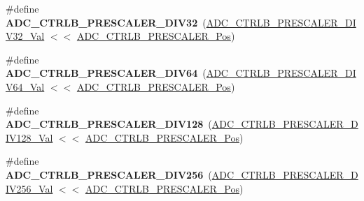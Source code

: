 \begin{DoxyCompactItemize}
\item 
\hypertarget{group___s_a_m_l21___a_d_c_ga4358e8572e688d1b0df0c34ca40dfc31}{}\#define {\bfseries A\+D\+C\+\_\+\+C\+T\+R\+L\+B\+\_\+\+P\+R\+E\+S\+C\+A\+L\+E\+R\+\_\+\+D\+I\+V32}~(\hyperlink{group___s_a_m_l21___a_d_c_gafd19aa73d07682c0d5d7fdda8ab230b5}{A\+D\+C\+\_\+\+C\+T\+R\+L\+B\+\_\+\+P\+R\+E\+S\+C\+A\+L\+E\+R\+\_\+\+D\+I\+V32\+\_\+\+Val} $<$$<$ \hyperlink{group___s_a_m_l21___a_d_c_ga67bbef18402c0d73dcc1698fa185ab76}{A\+D\+C\+\_\+\+C\+T\+R\+L\+B\+\_\+\+P\+R\+E\+S\+C\+A\+L\+E\+R\+\_\+\+Pos})\label{group___s_a_m_l21___a_d_c_ga4358e8572e688d1b0df0c34ca40dfc31}

\item 
\hypertarget{group___s_a_m_l21___a_d_c_gaf1291f3bcbf319b3200863a13855d8fe}{}\#define {\bfseries A\+D\+C\+\_\+\+C\+T\+R\+L\+B\+\_\+\+P\+R\+E\+S\+C\+A\+L\+E\+R\+\_\+\+D\+I\+V64}~(\hyperlink{group___s_a_m_l21___a_d_c_gafe5f527bda931e57829d72bfd2e9497f}{A\+D\+C\+\_\+\+C\+T\+R\+L\+B\+\_\+\+P\+R\+E\+S\+C\+A\+L\+E\+R\+\_\+\+D\+I\+V64\+\_\+\+Val} $<$$<$ \hyperlink{group___s_a_m_l21___a_d_c_ga67bbef18402c0d73dcc1698fa185ab76}{A\+D\+C\+\_\+\+C\+T\+R\+L\+B\+\_\+\+P\+R\+E\+S\+C\+A\+L\+E\+R\+\_\+\+Pos})\label{group___s_a_m_l21___a_d_c_gaf1291f3bcbf319b3200863a13855d8fe}

\item 
\hypertarget{group___s_a_m_l21___a_d_c_ga2a85edd59046e0d96f4426a94dfc695e}{}\#define {\bfseries A\+D\+C\+\_\+\+C\+T\+R\+L\+B\+\_\+\+P\+R\+E\+S\+C\+A\+L\+E\+R\+\_\+\+D\+I\+V128}~(\hyperlink{group___s_a_m_l21___a_d_c_ga358d362ec0e79900891a5f240fdab4ec}{A\+D\+C\+\_\+\+C\+T\+R\+L\+B\+\_\+\+P\+R\+E\+S\+C\+A\+L\+E\+R\+\_\+\+D\+I\+V128\+\_\+\+Val} $<$$<$ \hyperlink{group___s_a_m_l21___a_d_c_ga67bbef18402c0d73dcc1698fa185ab76}{A\+D\+C\+\_\+\+C\+T\+R\+L\+B\+\_\+\+P\+R\+E\+S\+C\+A\+L\+E\+R\+\_\+\+Pos})\label{group___s_a_m_l21___a_d_c_ga2a85edd59046e0d96f4426a94dfc695e}

\item 
\hypertarget{group___s_a_m_l21___a_d_c_ga5c9e7c35c7ad9032ce0ed62fabb90b83}{}\#define {\bfseries A\+D\+C\+\_\+\+C\+T\+R\+L\+B\+\_\+\+P\+R\+E\+S\+C\+A\+L\+E\+R\+\_\+\+D\+I\+V256}~(\hyperlink{group___s_a_m_l21___a_d_c_gaf654c74504398792bf66d522f00673fa}{A\+D\+C\+\_\+\+C\+T\+R\+L\+B\+\_\+\+P\+R\+E\+S\+C\+A\+L\+E\+R\+\_\+\+D\+I\+V256\+\_\+\+Val} $<$$<$ \hyperlink{group___s_a_m_l21___a_d_c_ga67bbef18402c0d73dcc1698fa185ab76}{A\+D\+C\+\_\+\+C\+T\+R\+L\+B\+\_\+\+P\+R\+E\+S\+C\+A\+L\+E\+R\+\_\+\+Pos})\label{group___s_a_m_l21___a_d_c_ga5c9e7c35c7ad9032ce0ed62fabb90b83}


\end{DoxyCompactItemize}
